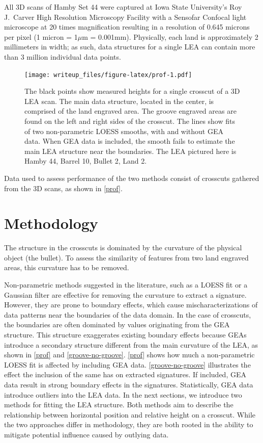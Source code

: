 \documentclass[12pt]{article}
\begin{document}
All 3D scans of Hamby Set 44 were captured at Iowa State University's
Roy J.~Carver High Resolution Microscopy Facility with a Sensofar
Confocal light microscope at 20 times magnification resulting in a
resolution of 0.645 microns per pixel (1 micron = 1\(\mu\)m = 0.001mm).
Physically, each land is approximately 2 millimeters in width; as such,
data structures for a single LEA can contain more than 3 million
individual data points.

\begin{figure}
\centering
\texttt{[image: writeup\_files/figure-latex/prof-1.pdf]}
\caption{\label{prof}The black points show measured heights for a single
crosscut of a 3D LEA scan. The main data structure, located in the
center, is comprised of the land engraved area. The groove engraved
areas are found on the left and right sides of the crosscut. The lines
show fits of two non-parametric LOESS smooths, with and without GEA
data. When GEA data is included, the smooth fails to estimate the main
LEA structure near the boundaries. The LEA pictured here is Hamby 44,
Barrel 10, Bullet 2, Land 2.}
\end{figure}

Data used to assess performance of the two methods consist of crosscuts
gathered from the 3D scans, as shown in \autoref{prof}.

\section{Methodology}

The structure in the crosscuts is dominated by the curvature of the
physical object (the bullet). To assess the similarity of features from
two land engraved areas, this curvature has to be removed.

Non-parametric methods suggested in the literature, such as a LOESS fit
\citep{Hare1} or a Gaussian filter \citep{Chu1} are effective for
removing the curvature to extract a signature. However, they are prone
to boundary effects, which cause mischaracterizations of data patterns
near the boundaries of the data domain. In the case of crosscuts, the
boundaries are often dominated by values originating from the GEA
structure. This structure exaggerates existing boundary effects because
GEAs introduce a secondary structure different from the main curvature
of the LEA, as shown in \autoref{prof} and \autoref{groove-no-groove}.
\autoref{prof} shows how much a non-parametric LOESS fit is affected by
including GEA data. \autoref{groove-no-groove} illustrates the effect
the inclusion of the same has on extracted signatures. If included, GEA
data result in strong boundary effects in the signatures. Statistically,
GEA data introduce outliers into the LEA data. In the next sections, we
introduce two methods for fitting the LEA structure. Both methods aim to
describe the relationship between horizontal position and relative
height on a crosscut. While the two approaches differ in methodology,
they are both rooted in the ability to mitigate potential influence
caused by outlying data.
\end{document}
